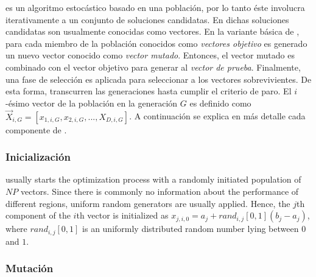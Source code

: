 \DE{} es un algoritmo estocástico basado en una población, por lo tanto éste involucra iterativamente a un conjunto de soluciones candidatas.
%
En \DE{} dichas soluciones candidatas son usualmente conocidas como vectores.
%
En la variante básica de \DE{}, para cada miembro de la población conocidos como \textit{vectores objetivo} es generado un nuevo vector conocido como \textit{vector mutado}.
%
Entonces, el vector mutado es combinado con el vector objetivo para generar al \textit{vector de prueba}.
%
Finalmente, una fase de selección es aplicada para seleccionar a los vectores sobrevivientes.
%
De esta forma, transcurren las generaciones hasta cumplir el criterio de paro.
%
El $i$-ésimo vector de la población en la generación $G$ es definido como$\vec{X}_{i,G} = [x_{1,i,G}, x_{2,i,G},..., X_{D,i, G}]$.
%
A continuación se explica en más detalle cada componente de \DE{}.


\subsubsection{Inicialización}

\DE{} usually starts the optimization process with a randomly initiated population of $NP$ vectors.
%
Since there is commonly no information about the performance of different regions, uniform random generators are usually applied.
%
Hence, the $j$th component of the $i$th vector is initialized as $x_{j,i,0} = a_{j} + rand_{i,j}[0,1] (b_{j} - a_{j})$,
where $rand_{i,j}[0,1]$ is an uniformly distributed random number lying between $0$ and $1$.

\subsubsection{Mutación}

